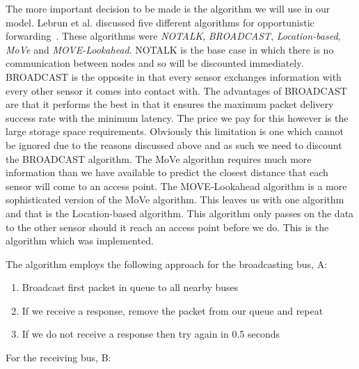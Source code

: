         The more important decision to be made is the algorithm we will use in our model. Lebrun et al.  discussed five different algorithms for opportunistic forwarding~\cite{opportunisticforwarding}. These algorithms were \emph{NOTALK}, \emph{BROADCAST}, \emph{Location-based}, \emph{MoVe} and \emph{MOVE-Lookahead}. NOTALK is the base case in which there is no communication between nodes and so will be discounted immediately. BROADCAST is the opposite in that every sensor exchanges information with every other sensor it comes into contact with. The advantages of BROADCAST are that it performs the best in that it ensures the maximum packet delivery success rate with the minimum latency. The price we pay for this however is the large storage space requirements. Obviously this limitation is one which cannot be ignored due to the reasons discussed above and as such we need to discount the BROADCAST algorithm. The MoVe algorithm requires much more information than we have available to predict the closest distance that each sensor will come to an access point. The MOVE-Lookahead algorithm is a more sophisticated version of the MoVe algorithm. This leaves us with one algorithm and that is the Location-based algorithm. This algorithm only passes on the data to the other sensor should it reach an access point before we do. This is the algorithm which was implemented. 

        The algorithm employs the following approach for the broadcasting bus, A:


        \begin{enumerate}
            \item Broadcast first packet in queue to all nearby buses
            \item If we receive a response, remove the packet from our queue and repeat
            \item If we do not receive a response then try again in 0.5 seconds
        \end{enumerate}

        For the receiving bus, B:

